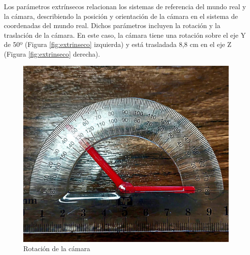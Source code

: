 Los parámetros extrínsecos relacionan los sistemas de referencia del mundo real y la cámara, describiendo la posición y orientación de la cámara en el sistema de coordenadas del mundo real. Dichos parámetros incluyen la rotación y la traslación de la cámara. En este caso, la cámara tiene una rotación sobre el eje Y de 50º (Figura \ref{fig:extrinseco} izquierda) y está trasladada 8,8 cm en el eje Z (Figura \ref{fig:extrinseco} derecha). 

\begin{figure}[ht!]
	\centering
	\begin{minipage}{0.45\linewidth}
		\centering
		\includegraphics[width=\linewidth]{figs/cap6/rotation.jpeg}
		\caption*{\centering Rotación de la cámara} 
	\end{minipage}
	\hspace{2 cm}
	\begin{minipage}{0.35\linewidth}
		\centering

\end{minipage}
\end{figure}
